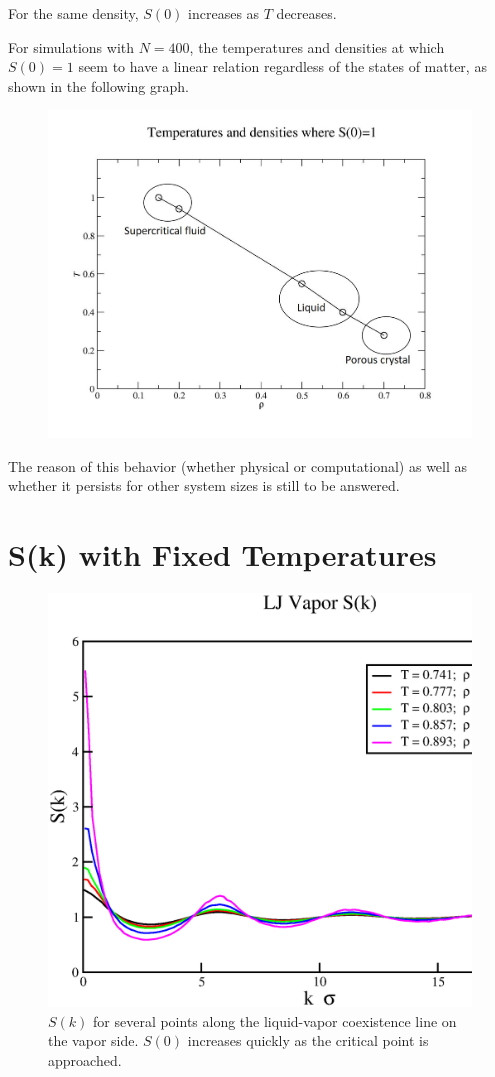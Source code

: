 \documentclass[12pt]{article}
\begin{document}
For the same density, $S(0)$ increases as $T$ decreases. 

For simulations with $N=400$, the temperatures and densities at which $S(0)=1$ seem to have a linear relation regardless of the states of matter, as shown in the following graph. 

\begin{figure}[H]
		\centering
		\includegraphics[width=0.7\linewidth]{fallBelow1.jpg}
		\label{fig:fallBelow1}
\end{figure}

The reason of this behavior (whether physical or computational) as well as whether it persists for other system sizes is still to be answered.

\section{S(k) with Fixed Temperatures}
\begin{figure}[H]
    \centering
    \includegraphics[width=6in]{032019LJVaporAlongDome.eps}
    \caption*{$S(k)$ for several points along the liquid-vapor coexistence line on the vapor side. $S(0)$ increases quickly as the critical point is approached.}
\end{figure}
\end{document}
